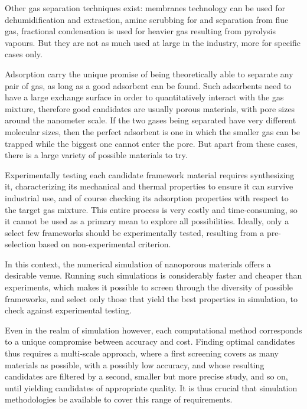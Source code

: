 Other gas separation techniques exist: membranes technology can be used for dehumidification and  extraction, amine scrubbing for  and  separation from flue gas, fractional condensation is used for heavier gas resulting from pyrolysis vapours. But they are not as much used at large in the industry, more for specific cases only.

Adsorption carry the unique promise of being theoretically able to separate any pair of gas, as long as a good adsorbent can be found. Such adsorbents need to have a large exchange surface in order to quantitatively interact with the gas mixture, therefore good candidates are usually porous materials, with pore sizes around the nanometer scale. If the two gases being separated have very different molecular sizes, then the perfect adsorbent is one in which the smaller gas can be trapped while the biggest one cannot enter the pore. But apart from these cases, there is a large variety of possible materials to try.

Experimentally testing each candidate framework material requires synthesizing it, characterizing its mechanical and thermal properties to ensure it can survive industrial use, and of course checking its adsorption properties with respect to the target gas mixture. This entire process is very costly and time-consuming, so it cannot be used as a primary mean to explore all possibilities. Ideally, only a select few frameworks should be experimentally tested, resulting from a pre-selection based on non-experimental criterion.

In this context, the numerical simulation of nanoporous materials offers a desirable venue. Running such simulations is considerably faster and cheaper than experiments, which makes it possible to screen through the diversity of possible frameworks, and select only those that yield the best properties in simulation, to check against experimental testing.

Even in the realm of simulation however, each computational method corresponds to a unique compromise between accuracy and cost. Finding optimal candidates thus requires a multi-scale approach, where a first screening covers as many materials as possible, with a possibly low accuracy, and whose resulting candidates are filtered by a second, smaller but more precise study, and so on, until yielding candidates of appropriate quality. It is thus crucial that simulation methodologies be available to cover this range of requirements.

\vspace{2em}

